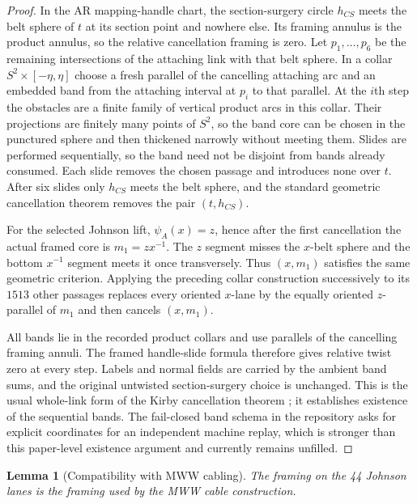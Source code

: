 \documentclass[11pt]{amsart}
\newtheorem{lemma}[theorem]{Lemma}
\theoremstyle{definition}
\theoremstyle{remark}
\begin{document}
\begin{proof}
In the AR mapping-handle chart, the section-surgery circle $h_{CS}$ meets the
belt sphere of $t$ at its section point and nowhere else.  Its framing annulus
is the product annulus, so the relative cancellation framing is zero.  Let
$p_1,\ldots,p_6$ be the remaining intersections of the attaching link with
that belt sphere.  In a collar $S^2\times[-\eta,\eta]$ choose a fresh parallel
of the cancelling attaching arc and an embedded band from the attaching
interval at $p_i$ to that parallel.  At the $i$th step the obstacles are a
finite family of vertical product arcs in this collar.  Their projections are
finitely many points of $S^2$, so the band core can be chosen in the punctured
sphere and then thickened narrowly without meeting them.  Slides are performed sequentially, so the band
need not be disjoint from bands already consumed.  Each slide removes the
chosen passage and introduces none over $t$.  After six slides only $h_{CS}$
meets the belt sphere, and the standard geometric cancellation theorem removes
the pair $(t,h_{CS})$.

For the selected Johnson lift, $\psi_A(x)=z$, hence after the first
cancellation the actual framed core is $m_1=zx^{-1}$.  The $z$ segment misses
the $x$-belt sphere and the bottom $x^{-1}$ segment meets it once transversely.
Thus $(x,m_1)$ satisfies the same geometric criterion.  Applying the preceding
collar construction successively to its $1513$ other passages replaces every
oriented $x$-lane by the equally oriented $z$-parallel of $m_1$ and then
cancels $(x,m_1)$.

All bands lie in the recorded product collars and use parallels of the
cancelling framing annuli.  The framed handle-slide formula therefore gives
relative twist zero at every step.  Labels and normal fields are carried by
the ambient band sums, and the original untwisted section-surgery choice is
unchanged.  This is the usual whole-link form of the Kirby cancellation
theorem \cite{Kirby1978}; it establishes existence of the sequential bands.
The fail-closed band schema in the repository asks for explicit coordinates
for an independent machine replay, which is stronger than this paper-level
existence argument and currently remains unfilled.
\end{proof}

\begin{lemma}[Compatibility with MWW cabling]\label{lem:P0c}
The framing on the 44 Johnson lanes is the framing used by the MWW cable
construction.
\end{lemma}
\end{document}

